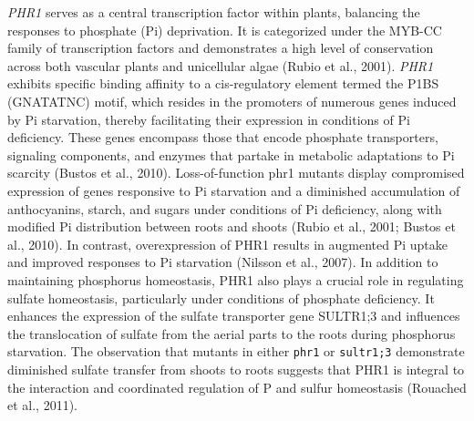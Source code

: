 \documentclass[10pt,letterpaper]{article}
\begin{document}
\begin{itemize}
\textit{PHR1} serves as a central transcription factor within plants, balancing the responses to phosphate (Pi) deprivation. It is categorized under the MYB-CC family of transcription factors and demonstrates a high level of conservation across both vascular plants and unicellular algae (Rubio et al., 2001). \textit{PHR1} exhibits specific binding affinity to a cis-regulatory element termed the P1BS (GNATATNC) motif, which resides in the promoters of numerous genes induced by Pi starvation, thereby facilitating their expression in conditions of Pi deficiency. These genes encompass those that encode phosphate transporters, signaling components, and enzymes that partake in metabolic adaptations to Pi scarcity (Bustos et al., 2010). Loss-of-function phr1 mutants display compromised expression of genes responsive to Pi starvation and a diminished accumulation of anthocyanins, starch, and sugars under conditions of Pi deficiency, along with modified Pi distribution between roots and shoots (Rubio et al., 2001; Bustos et al., 2010). In contrast, overexpression of PHR1 results in augmented Pi uptake and improved responses to Pi starvation (Nilsson et al., 2007). In addition to maintaining phosphorus homeostasis, PHR1 also plays a crucial role in regulating sulfate homeostasis, particularly under conditions of phosphate deficiency. It enhances the expression of the sulfate transporter gene SULTR1;3 and influences the translocation of sulfate from the aerial parts to the roots during phosphorus starvation. The observation that mutants in either \texttt{phr1} or \texttt{sultr1;3} demonstrate diminished sulfate transfer from shoots to roots suggests that PHR1 is integral to the interaction and coordinated regulation of P and sulfur homeostasis (Rouached et al., 2011). 





\end{itemize}
\end{document}
